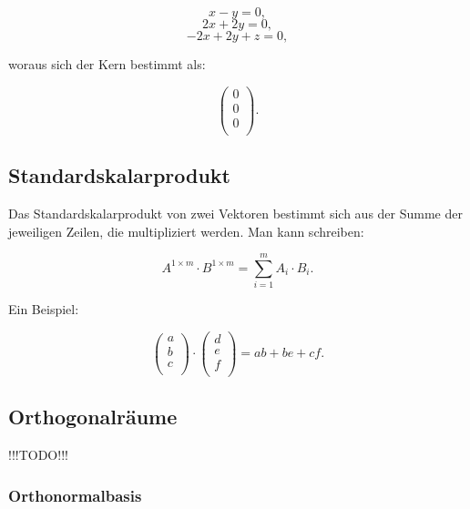 \documentclass{scrartcl}
\newcommand{\TODO}{{\Huge\textcolor{HeavyRed}{\danger !!!TODO!!! \danger}}}
\begin{document}
\begin{equation}
	x - y = 0,
\end{equation}
\begin{equation}
	2x + 2y = 0,
\end{equation}
\begin{equation}
	-2x + 2y + z = 0,
\end{equation}

woraus sich der Kern bestimmt als:

\begin{equation}
	\begin{pmatrix*}
		0 \\
		0 \\
		0 \\
	\end{pmatrix*}.
\end{equation}

\subsection{Standardskalarprodukt}

Das Standardskalarprodukt von zwei Vektoren bestimmt sich aus der Summe der jeweiligen Zeilen, die multipliziert werden. Man kann schreiben:

\begin{equation}
	A^{1\times m} \cdot B^{1 \times m} = \sum_{i = 1}^{m} A_i \cdot B_i.
\end{equation}

Ein Beispiel:

\begin{equation}
	\begin{pmatrix*}
		a \\
		b \\
		c \\
	\end{pmatrix*} \cdot 
	\begin{pmatrix*}
		d \\
		e \\
		f \\
	\end{pmatrix*} = ab + be + cf.
\end{equation}

\subsection{Orthogonalräume}

\TODO

\subsubsection{Orthonormalbasis}
\end{document}
